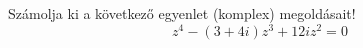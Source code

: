 \documentclass[11pt]{scrartcl}
\begin{document}
Számolja ki a következő egyenlet (komplex) megoldásait!
\[
	z^4 - (3 + 4i) z^3 + 12i z^2 = 0
\]
\end{document}
